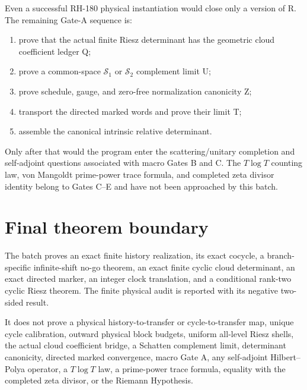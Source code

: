 \documentclass[12pt]{article}
\theoremstyle{remark}
\begin{document}
Even a successful RH-180 physical instantiation would close only a version of
R.  The remaining Gate-A sequence is:
\begin{enumerate}[leftmargin=2em]
\item prove that the actual finite Riesz determinant has the geometric cloud
coefficient ledger Q;
\item prove a common-space $\mathcal S_1$ or $\mathcal S_2$ complement limit
U;
\item prove schedule, gauge, and zero-free normalization canonicity Z;
\item transport the directed marked words and prove their limit T;
\item assemble the canonical intrinsic relative determinant.
\end{enumerate}
Only after that would the program enter the scattering/unitary completion and
self-adjoint questions associated with macro Gates B and C.  The
$T\log T$ counting law, von Mangoldt prime-power trace formula, and completed
zeta divisor identity belong to Gates C--E and have not been approached by
this batch.

\section{Final theorem boundary}

The batch proves an exact finite history realization, its exact cocycle, a
branch-specific infinite-shift no-go theorem, an exact finite cyclic cloud
determinant, an exact directed marker, an integer clock translation, and a
conditional rank-two cyclic Riesz theorem.  The finite physical audit is
reported with its negative two-sided result.

It does not prove a physical history-to-transfer or cycle-to-transfer map,
unique cycle calibration, outward physical block budgets, uniform all-level
Riesz shells, the actual cloud coefficient bridge, a Schatten complement
limit, determinant canonicity, directed marked convergence, macro Gate A,
any self-adjoint Hilbert--Polya operator, a $T\log T$ law, a prime-power trace
formula, equality with the completed zeta divisor, or the Riemann Hypothesis.



\end{document}
